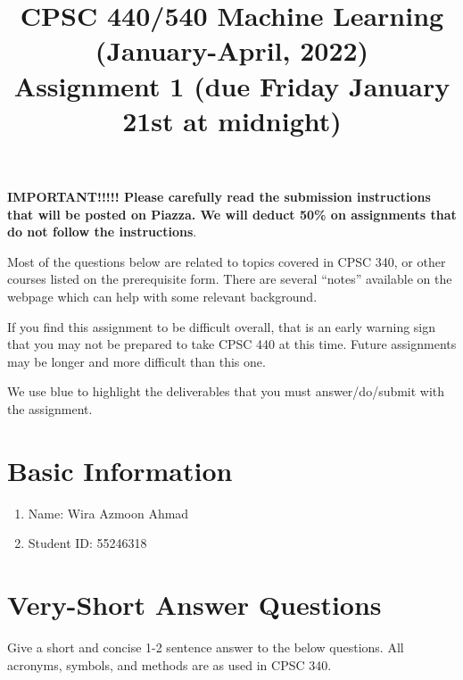 \documentclass{article}
\def\blu#1{{\color{blu}#1}}
\def\enum#1{\begin{enumerate}#1\end{enumerate}}
\begin{document}
\title{CPSC 440/540 Machine Learning (January-April, 2022)\\Assignment 1 (due Friday January 21st at midnight)}
\author{}
\date{}
\maketitle
\vspace{-4em}

\textbf{IMPORTANT!!!!! Please carefully read the submission instructions that will be posted on Piazza. We will deduct 50\% on assignments that do not follow the instructions}.

Most of the questions below are related to topics covered in CPSC 340, or other courses listed on the prerequisite form. There are several ``notes'' available on the webpage which can help with some relevant background.

If you find this assignment to be difficult overall, that is an early warning sign that you may not be prepared to take CPSC 440
at this time. Future assignments may be longer and more difficult than this one.

We use \blu{blue} to highlight the deliverables that you must answer/do/submit with the assignment.

\section*{Basic Information}


\blu{\enum{
\item Name: Wira Azmoon Ahmad
\item Student ID: 55246318
}}

\pagebreak


\section{Very-Short Answer Questions}



Give a short and concise 1-2 sentence answer to the below questions. All acronyms, symbols, and methods are as used in CPSC 340.
\end{document}
